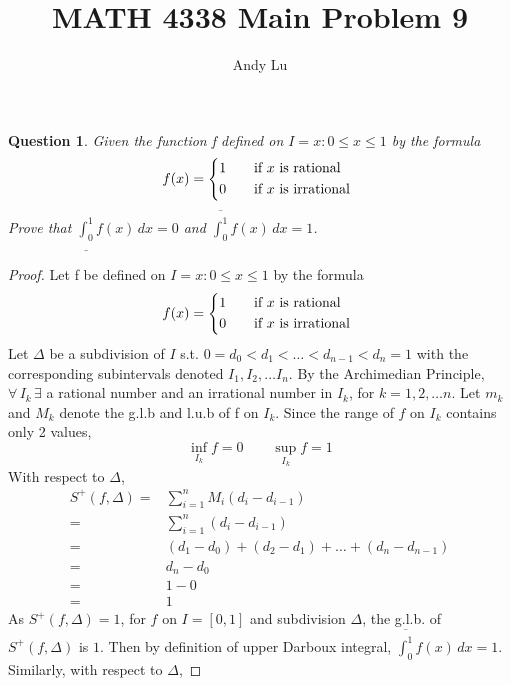 \documentclass{article}
\title{MATH 4338 Main Problem 9}
\date{}
\author{Andy Lu}
\newtheorem*{theorem}{Question}
\begin{document}
  \maketitle
  \begin{theorem}
    Given the function f defined on $I = {x: 0 \leq x \leq 1}$ by the formula
    \[
      f(x) =
      \begin{cases*}
        1 \quad& if $x$ is rational \\
        0 \quad& if $x$ is irrational
      \end{cases*}\]
      Prove that $\underline{\int_{0}^{1}}f(x) \, dx = 0$ and 
      $\overline{\int_{0}^{1}}f(x) \, dx = 1$.
  \end{theorem}
  \begin{proof}
    Let f be defined on $I = {x: 0 \leq x \leq 1}$ by the formula
    \[
      f(x) =
      \begin{cases*}
        1 \quad& if $x$ is rational \\
        0 \quad& if $x$ is irrational
      \end{cases*}\]
    Let $\Delta$ be a subdivision of $I$ s.t. 
    $0 = d_0 < d_1 < \ldots < d_{n-1} < d_n = 1$ with the corresponding 
    subintervals denoted $I_1, I_2, \ldots I_n$.
    By the Archimedian Principle, 
    $\forall \, I_k \, \exists$ a rational number and an irrational number in
    $I_k$, for $k = 1,2,\ldots n$. Let $m_k$ and $M_k$ denote the g.l.b and
     l.u.b of f on $I_k$. Since the range of $f$ on $I_k$ contains only 2
    values,
    \begin{equation}
      \inf_{I_k}f = 0 \qquad \sup_{I_k} f = 1
    \end{equation}
    With respect to $\Delta$,
    \begin{align*}
      S^{+}(f,\Delta) =& \sum_{i=1}^{n} M_{i}(d_i - d_{i-1})
      \tag{by definition of Upper Darboux Sum}\\
      =& \sum_{i=1}^{n} (d_i - d_{i-1}) \tag{since $M_i = 1$}\\
      =& (d_1 - d_0) + (d_2 - d_1) + \ldots + (d_n - d_{n-1})
      \tag{by definition of sum}\\
      =& d_n - d_0 \tag{by combining like terms} \\
      =& 1- 0 \tag{by construction of $\Delta$} \\
      =& 1 
    \end{align*}
    As $S^{+}(f,\Delta) = 1$, for $f$ on $I=[0,1]$ and subdivision $\Delta$, the
    g.l.b. of $S^{+}(f,\Delta)$ is $1$. Then by definition of upper Darboux
    integral, $\overline{\int_{0}^{1}}f(x) \, dx = 1$. Similarly, with respect 
    to $\Delta$,
  \end{proof}
\end{document}
